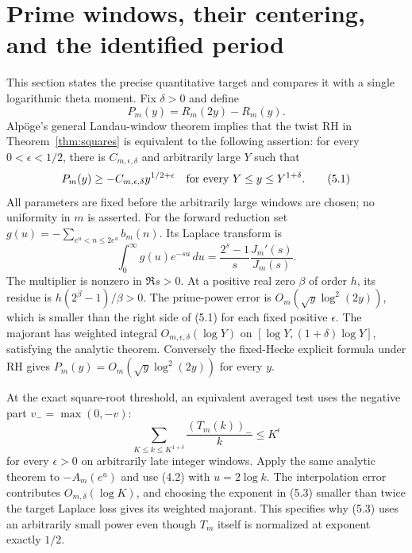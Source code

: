 \documentclass[11pt]{article}
\begin{document}
\section{Prime windows, their centering, and the identified period}
This section states the precise quantitative target and compares it with a single logarithmic theta moment.
Fix $\delta>0$ and define
\[
 P_m(y)=R_m(2y)-R_m(y).
\]
Alp\"oge's general Landau-window theorem \cite{AlpogeWindow} implies that the twist RH in Theorem~\ref{thm:squares} is equivalent to the following assertion: for every $0<\epsilon<1/2$, there is $C_{m,\epsilon,\delta}$ and arbitrarily large $Y$ such that
\[
 P_m(y)\ge-C_{m,\epsilon,\delta}y^{1/2+\epsilon}
       \quad\hbox{for every }Y\le y\le Y^{1+\delta}.
 \tag{5.1}
\]
All parameters are fixed before the arbitrarily large windows are chosen; no uniformity in $m$ is asserted. For the forward reduction set $g(u)=-\sum_{e^u<n\le2e^u}b_m(n)$. Its Laplace transform is
\[
 \int_0^\infty g(u)e^{-su}\,du
       =\frac{2^s-1}{s}\frac{J_m'(s)}{J_m(s)}.
 \tag{5.2}
\]
The multiplier is nonzero in $\Re s>0$. At a positive real zero $\beta$ of order $h$, its residue is $h(2^\beta-1)/\beta>0$. The prime-power error is $O_m(\sqrt y\log^2(2y))$, which is smaller than the right side of (5.1) for each fixed positive $\epsilon$. The majorant has weighted integral $O_{m,\epsilon,\delta}(\log Y)$ on $[\log Y,(1+\delta)\log Y]$, satisfying the analytic theorem. Conversely the fixed-Hecke explicit formula under RH gives $P_m(y)=O_m(\sqrt y\log^2(2y))$ for every $y$.

At the exact square-root threshold, an equivalent averaged test uses the negative part $v_-=\max(0,-v)$:
\[
 \sum_{K\le k\le K^{1+\delta}}\frac{(T_m(k))_-}{k}\le K^\epsilon
 \tag{5.3}
\]
for every $\epsilon>0$ on arbitrarily late integer windows. Apply the same analytic theorem to $-A_m(e^u)$ and use (4.2) with $u=2\log k$. The interpolation error contributes $O_{m,\delta}(\log K)$, and choosing the exponent in (5.3) smaller than twice the target Laplace loss gives its weighted majorant. This specifies why (5.3) uses an arbitrarily small power even though $T_m$ itself is normalized at exponent exactly $1/2$.
\end{document}
